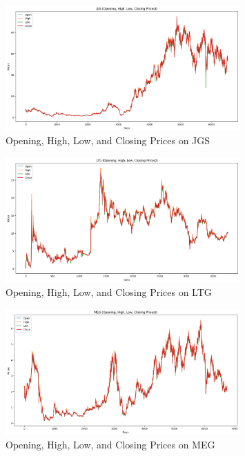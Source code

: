 \begin{figure}[ht]
    \centering
    \includegraphics[width=0.80\textwidth]{./assets/Appendices/B/OHLC_Prices/JGS.png}
    \caption{Opening, High, Low, and Closing Prices on JGS}
    \label{fig:ohlc_JGS}
\end{figure}
\FloatBarrier
    
\begin{figure}[ht]
    \centering
    \includegraphics[width=0.80\textwidth]{./assets/Appendices/B/OHLC_Prices/LTG.png}
    \caption{Opening, High, Low, and Closing Prices on LTG}
    \label{fig:ohlc_LTG}
\end{figure}
\FloatBarrier

\begin{figure}[ht]
    \centering
    \includegraphics[width=0.80\textwidth]{./assets/Appendices/B/OHLC_Prices/MEG.png}
    \caption{Opening, High, Low, and Closing Prices on MEG}
    \label{fig:ohlc_MEG}
\end{figure}
\FloatBarrier

